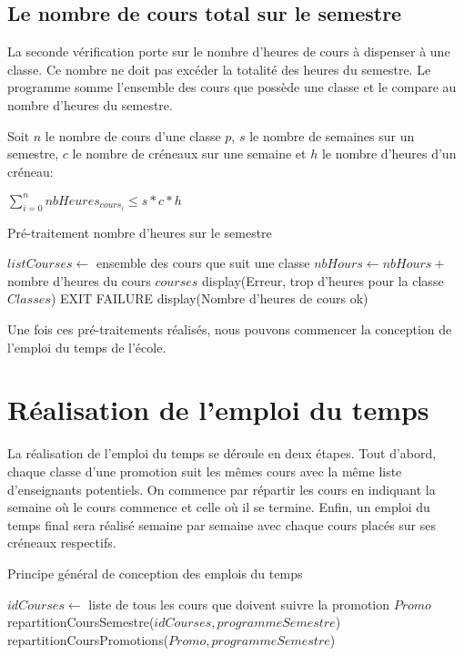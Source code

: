 \documentclass[12pt,a4paper,french]{article}
\begin{document}
\newpage

\subsection{Le nombre de cours total sur le semestre}
La seconde vérification porte sur le nombre d'heures de cours à dispenser à une classe. Ce nombre ne doit pas excéder la totalité des heures du semestre. Le programme somme l'ensemble des cours que possède une classe et le compare au nombre d'heures du semestre.

Soit $n$ le nombre de cours d'une classe $p$, $s$ le nombre de semaines sur un semestre, $c$ le nombre de créneaux sur une semaine et $h$ le nombre d'heures d'un créneau: 

\begin{center}
$\sum_{i=0}^n nbHeures_{cours_i} \leq s*c*h$
\end{center}

\begin{algorithm}
\caption{Pré-traitement nombre d'heures sur le semestre}
\begin{algorithmic}
\STATE $listCourses \leftarrow$ ensemble des cours que suit une classe
\STATE $nbHours \leftarrow nbHours +$ nombre d'heures du cours $courses$
\ENDFOR
{}
\STATE display(Erreur, trop d'heures pour la classe $Classes$)
\STATE EXIT FAILURE
\ENDIF
\ENDFOR
\STATE display(Nombre d'heures de cours ok)
\end{algorithmic}
\end{algorithm}

Une fois ces pré-traitements réalisés, nous pouvons commencer la conception de l'emploi du temps de l'école.

\newpage
\section{Réalisation de l'emploi du temps}
La réalisation de l'emploi du temps se déroule en deux étapes. Tout d'abord, chaque classe d'une promotion suit les mêmes cours avec la même liste d'enseignants potentiels. On commence par répartir les cours en indiquant la semaine où le cours commence et celle où il se termine. 
Enfin, un emploi du temps final sera réalisé semaine par semaine avec chaque cours placés sur ses créneaux respectifs.

\begin{algorithm}
\caption{Principe général de conception des emplois du temps}
\begin{algorithmic}
\STATE $idCourses \leftarrow$ liste de tous les cours que doivent suivre la promotion $Promo$
\STATE repartitionCoursSemestre($idCourses, programmeSemestre$)
\STATE repartitionCoursPromotions($Promo, programmeSemestre$)
\ENDFOR
\end{algorithmic}
\end{algorithm}
\end{document}
